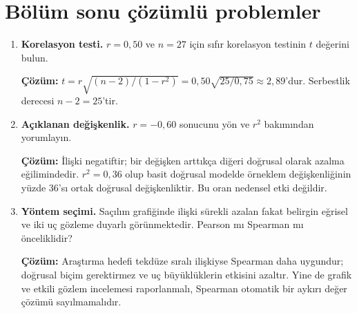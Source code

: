 \section{Bölüm sonu çözümlü problemler}

\begin{enumerate}
  \item \textbf{Korelasyon testi.} $r=0{,}50$ ve $n=27$ için sıfır korelasyon testinin $t$ değerini bulun.

  \textbf{Çözüm:} $t=r\sqrt{(n-2)/(1-r^2)}=0{,}50\sqrt{25/0{,}75}\approx2{,}89$'dur. Serbestlik derecesi $n-2=25$'tir.

  \item \textbf{Açıklanan değişkenlik.} $r=-0{,}60$ sonucunu yön ve $r^2$ bakımından yorumlayın.

  \textbf{Çözüm:} İlişki negatiftir; bir değişken arttıkça diğeri doğrusal olarak azalma eğilimindedir. $r^2=0{,}36$ olup basit doğrusal modelde örneklem değişkenliğinin yüzde 36'sı ortak doğrusal değişkenliktir. Bu oran nedensel etki değildir.

  \item \textbf{Yöntem seçimi.} Saçılım grafiğinde ilişki sürekli azalan fakat belirgin eğrisel ve iki uç gözleme duyarlı görünmektedir. Pearson mı Spearman mı önceliklidir?

  \textbf{Çözüm:} Araştırma hedefi tekdüze sıralı ilişkiyse Spearman daha uygundur; doğrusal biçim gerektirmez ve uç büyüklüklerin etkisini azaltır. Yine de grafik ve etkili gözlem incelemesi raporlanmalı, Spearman otomatik bir aykırı değer çözümü sayılmamalıdır.
\end{enumerate}